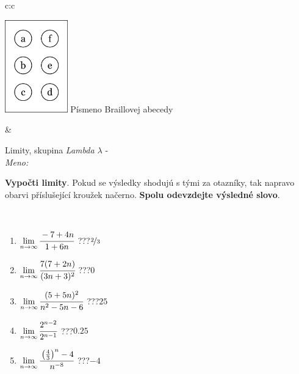 \documentclass[10pt]{report}
\begin{document}
\begin{tabular}{c:c}
\begin{minipage}[c][104.5mm][t]{0.5\linewidth}
\begin{center}
\begin{minipage}{0.20\linewidth}
\begin{center}
\includegraphics[height=40mm]{../images/braille.png}
{\small Písmeno Braillovej abecedy}
\end{center}
\end{minipage}
\end{center}
\end{minipage}
&
\begin{minipage}[c][104.5mm][t]{0.5\linewidth}
\begin{center}
\vspace{7mm}
{\huge Limity, skupina \textit{Lambda $\lambda$} -}\\[5mm]
\textit{Meno:}\phantom{xxxxxxxxxxxxxxxxxxxxxxxxxxxxxxxxxxxxxxxxxxxxxxxxxxxxxxxxxxxxxxxxx}\\[5mm]
\begin{minipage}{0.95\linewidth}
\begin{center}
\textbf{Vypočti limity}. Pokud se výsledky shodujú s tými za otazníky, tak napravo\\obarvi příslušející kroužek načerno. \textbf{Spolu odevzdejte výsledné slovo}.
\end{center}
\end{minipage}
\\[1mm]
\begin{minipage}{0.79\linewidth}
\begin{center}
\begin{varwidth}{\linewidth}
\begin{enumerate}
\normalsize
\item $\lim\limits_{n\to\infty}\cfrac{-7+4n}{1+6n}$\quad \dotfill\; ???\;\dotfill \quad $\nicefrac{2}{3}$
\item $\lim\limits_{n\to\infty}\cfrac{7(7+2n)}{(3n+3)^2}$\quad \dotfill\; ???\;\dotfill \quad $0$
\item $\lim\limits_{n\to\infty}\cfrac{(5+5n)^2}{n^2-5n-6}$\quad \dotfill\; ???\;\dotfill \quad $25$
\item $\lim\limits_{n\to\infty}\cfrac{2^{n-2}}{2^{n-1}}$\quad \dotfill\; ???\;\dotfill \quad $0.25$
\item $\lim\limits_{n\to\infty}\cfrac{\left(\frac{4}{3}\right)^n -4}{n^{-8}}$\quad \dotfill\; ???\;\dotfill \quad $-4$

\end{enumerate}
\end{varwidth}
\end{center}
\end{minipage}
\end{center}
\end{minipage}
\end{tabular}
\end{document}
